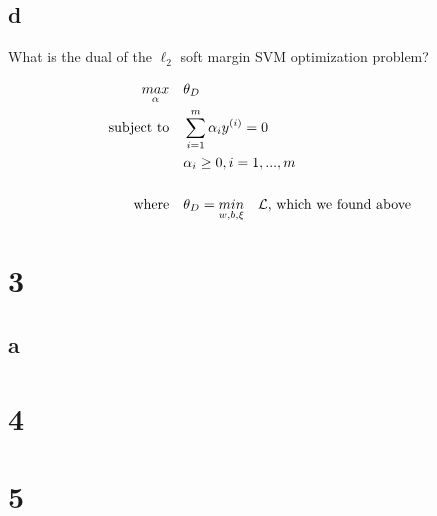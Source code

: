 \documentclass[11pt]{article}
\begin{document}
\subsection*{d}

What is the dual of the $\ell_2$ soft margin SVM optimization problem?

\begin{align*}
  \underset{\alpha}{max} &\quad \theta_D \\
  \text{subject to}      &\quad \sum_{i=1}^{m} \alpha_i y^{(i)} = 0 \\
                         &\quad \alpha_i \geq 0, i=1,...,m \\
                         \\
  \text{where}           &\quad \theta_D = \underset{w,b,\xi}{min} \quad \mathcal{L} \text{, which we found above} \\
\end{align*}

\section*{3}

\subsection*{a}

\section*{4}

\section*{5}
\end{document}
